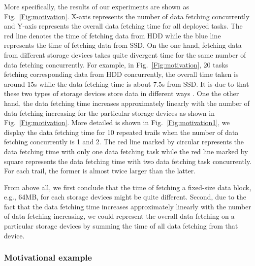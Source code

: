 \documentclass[conference]{IEEEtran}
\begin{document}
More specifically, the results of our experiments are shown as Fig.~\ref{Fig:motivation}. X-axis represents the number of data fetching concurrently and Y-axis represents the overall data fetching time for all deployed tasks. The red line denotes the time of fetching data from HDD while the blue line represents the time of fetching data from SSD. On the one hand, fetching data from different storage devices takes quite divergent time for the same number of data fetching concurrently. For example, in Fig.~\ref{Fig:motivation}, 20 tasks fetching corresponding data from HDD concurrently, the overall time taken is around 15s while the data fetching time is about 7.5s from SSD. It is due to that these two types of storage devices store data in different ways \cite{b46} \cite{b47}. 
One the other hand, the data fetching time increases approximately linearly with the number of data fetching increasing for the particular storage devices as shown in Fig.~\ref{Fig:motivation}. More detailed is shown in Fig.~\ref{Fig:motivation1}, we display the data fetching time for 10 repeated trails when the number of data fetching concurrently is 1 and 2. The red line marked by circular represents the data fetching time with only one data fetching task while the red line marked by square represents the data fetching time with two data fetching task concurrently. For each trail, the former is almost twice larger than the latter. %

From above all, we first conclude that the time of fetching a fixed-size data block, e.g., 64MB, for each storage devices might be quite different. Second, due to the fact that the data fetching time increases approximately linearly with the number of data fetching increasing, we could represent the overall data fetching on a particular storage devices by summing the time of all data fetching from that device. 


\subsubsection{Motivational example} 
\end{document}
